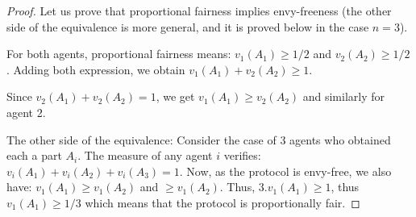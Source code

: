 \begin{proof}
Let us prove that proportional fairness implies envy-freeness (the other side of the equivalence is more general, and it is proved below in the case $n=3$).

For both agents, proportional fairness means: $v_1(A_1) \geq 1/2$ and $v_2(A_2) \geq 1/2$.
Adding both expression, we obtain $v_1(A_1)+v_2(A_2) \geq 1$.

Since $v_2(A_1) + v_2(A_2) = 1$, we get 
$v_1(A_1) \geq v_2(A_2)$ and similarly for agent 2. 
\bigskip

The other side of the equivalence: 
Consider the case of $3$ agents who obtained each a part $A_i$.
The measure of any agent $i$ verifies: $v_i(A_1)+v_i(A_2)+v_i(A_3) = 1$.
Now, as the protocol is envy-free, we also have: $v_1(A_1) \geq v_1(A_2)$ and $\geq v_1(A_2)$.
Thus, $3.v_1(A_1) \geq 1$, thus $v_1(A_1) \geq 1/3$ which means that the protocol is proportionally fair. 
\bigskip


\end{proof}
